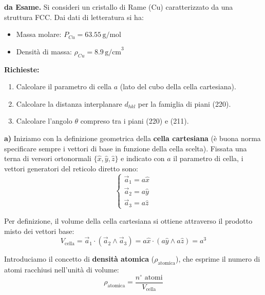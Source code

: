 \begin{exercise}
    
\textbf{da Esame.} Si consideri un cristallo di Rame (Cu) caratterizzato da una struttura FCC. Dai dati di letteratura si ha:
\begin{itemize}
    \item Massa molare: \( P_{Cu} = 63.55 \, \text{g/mol} \)
    \item Densità di massa: \( \rho_{Cu} = 8.9 \, \text{g/cm}^3 \)
\end{itemize}

\textbf{Richieste:}
\begin{enumerate}
    \item[a)] Calcolare il parametro di cella \( a \) (lato del cubo della cella cartesiana).
    \item[b)] Calcolare la distanza interplanare \( d_{hkl} \) per la famiglia di piani (220).
    \item[c)] Calcolare l'angolo \( \theta \) compreso tra i piani (220) e (211).
\end{enumerate}

\begin{solution}
    \textbf{a)}
Iniziamo con la definizione geometrica della \textbf{cella cartesiana} (è buona norma specificare sempre i vettori di base in funzione della cella scelta). Fissata una terna di versori ortonormali \( \{\hat{x}, \hat{y}, \hat{z}\} \) e indicato con \( a \) il parametro di cella, i vettori generatori del reticolo diretto sono:
\begin{equation}
\begin{cases}
    \vec{a}_1 = a\hat{x} \\
    \vec{a}_2 = a\hat{y} \\
    \vec{a}_3 = a\hat{z}
\end{cases}
\end{equation}

Per definizione, il volume della cella cartesiana si ottiene attraverso il prodotto misto dei vettori base:
\begin{equation}
    V_{\text{cella}} = \vec{a}_1 \cdot (\vec{a}_2 \wedge \vec{a}_3) = a\hat{x} \cdot (a\hat{y} \wedge a\hat{z}) = a^3
\end{equation}

Introduciamo il concetto di \textbf{densità atomica} (\( \rho_{\text{atomica}} \)), che esprime il numero di atomi racchiusi nell'unità di volume:
\begin{equation}
    \rho_{\text{atomica}} = \frac{n^\circ \text{ atomi}}{V_{\text{cella}}}
\end{equation}


\end{solution}
\end{exercise}
